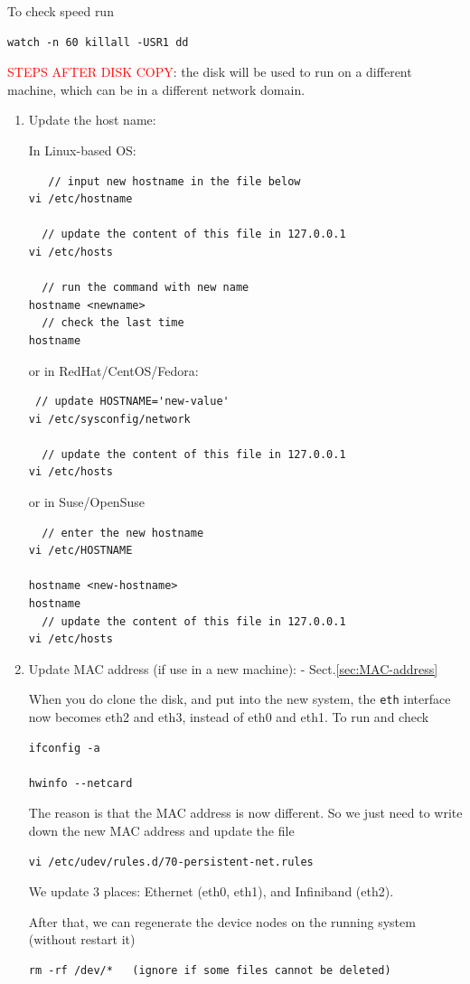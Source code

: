 To check speed run
\begin{verbatim}
watch -n 60 killall -USR1 dd
\end{verbatim}

\textcolor{red}{STEPS AFTER DISK COPY}: the disk will be used to run on a
different machine, which can be in a different network domain.
\begin{enumerate}
  \item Update the host name:

In Linux-based OS:
\begin{verbatim}
   // input new hostname in the file below
vi /etc/hostname

  // update the content of this file in 127.0.0.1
vi /etc/hosts

  // run the command with new name
hostname <newname>
  // check the last time
hostname
\end{verbatim}  
or in RedHat/CentOS/Fedora:
\begin{verbatim}
 // update HOSTNAME='new-value'
vi /etc/sysconfig/network

  // update the content of this file in 127.0.0.1
vi /etc/hosts
\end{verbatim}
or in Suse/OpenSuse
\begin{verbatim}
  // enter the new hostname
vi /etc/HOSTNAME

hostname <new-hostname>
hostname
  // update the content of this file in 127.0.0.1
vi /etc/hosts
\end{verbatim}
  
  \item Update MAC address (if use in a new machine): -
  Sect.\ref{sec:MAC-address}

When you do clone the disk, and put into the new system, the \verb!eth!
interface now becomes eth2 and eth3, instead of eth0 and eth1. To run and check
\begin{verbatim}
ifconfig -a

hwinfo --netcard
\end{verbatim}

The reason is that the MAC address is now different. So we just need to write
down the new MAC address and update the file 
\begin{verbatim}
vi /etc/udev/rules.d/70-persistent-net.rules
\end{verbatim}
We update 3 places: Ethernet (eth0, eth1), and Infiniband (eth2).

After that, we can regenerate the device nodes on the running system (without
restart it)
\begin{verbatim}
rm -rf /dev/*   (ignore if some files cannot be deleted)


\end{verbatim}
\end{enumerate}
